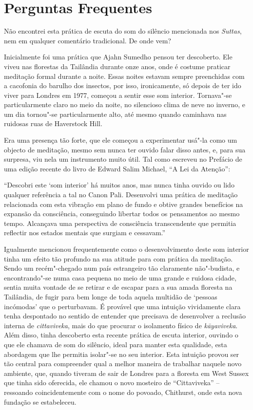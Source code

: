 \chapter{Perguntas Frequentes}

 Não encontrei esta prática de escuta do som do silêncio mencionada
nos \emph{Suttas}, nem em qualquer comentário tradicional. De onde vem?

\smallskip
\noindent
{} Inicialmente foi uma prática que Ajahn Sumedho pensou ter descoberto.
Ele viveu nas florestas da Tailândia durante onze anos, onde é costume
praticar meditação formal durante a noite. Essas noites estavam sempre
preenchidas com a cacofonia do barulho dos insectos, por isso,
ironicamente, só depois de ter ido viver para Londres em 1977, começou a
sentir esse som interior. Tornava"-se particularmente claro no meio da
noite, no silencioso clima de neve no inverno, e um dia tornou"-se
particularmente alto, até mesmo quando caminhava nas ruidosas ruas de
Haverstock Hill.

Era uma presença tão forte, que ele começou a experimentar usá"-la como um
objecto de meditação, mesmo sem nunca ter ouvido falar disso antes, e, para sua
surpresa, viu nela um instrumento muito útil. Tal como escreveu no Prefácio de
uma edição recente do livro de Edward Salim Michael, ``A Lei da
Atenção''\cite{attention}:

``Descobri este `som interior' há muitos anos, mas nunca tinha ouvido ou
lido qualquer referência a tal no Canon Pali. Desenvolvi uma prática de
meditação relacionada com esta vibração em plano de fundo e obtive
grandes benefícios na expansão da consciência, conseguindo libertar
todos os pensamentos ao mesmo tempo. Alcançava uma perspectiva de
consciência transcendente que permitia reflectir nos estados mentais que
surgiam e cessavam.''

Igualmente mencionou frequentemente como o desenvolvimento deste som
interior tinha um efeito tão profundo na sua atitude para com prática da
meditação. Sendo um recém"-chegado num país estrangeiro tão claramente
não"-budista, e encontrando"-se numa casa pequena no meio de uma grande e
ruidosa cidade, sentia muita vontade de se retirar e de escapar para a
sua amada floresta na Tailândia, de fugir para bem longe de toda aquela
multidão de `pessoas incómodas' que o perturbavam. É provável que uma
intuição vividamente clara tenha despontado no sentido de entender que
precisava de desenvolver a reclusão interna de \emph{cittaviveka}, mais
do que procurar o isolamento físico de \emph{kāyaviveka}. Além disso,
tinha descoberto esta recente prática de escuta interior, ouvindo o que
ele chamava de som do silêncio, ideal para manter esta qualidade, esta
abordagem que lhe permitia isolar"-se no seu interior. Esta intuição
provou ser tão central para compreender qual a melhor maneira de
trabalhar naquele novo ambiente, que, quando tiveram de sair de Londres
para a floresta em West Sussex que tinha sido oferecida, ele chamou o
novo mosteiro de ``Cittaviveka'' -- ressoando coincidentemente com o
nome do povoado, Chithurst, onde esta nova fundação se estabeleceu.

